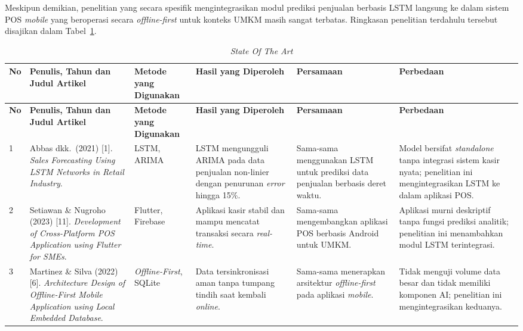 \documentclass[12pt, a4paper, onecolumn, oneside]{report}
\begin{document}
\begin{spacing}{1.5}
Meskipun demikian, penelitian yang secara spesifik mengintegrasikan modul prediksi penjualan berbasis LSTM langsung ke dalam sistem POS \textit{mobile} yang beroperasi secara \textit{offline-first} untuk konteks UMKM masih sangat terbatas. Ringkasan penelitian terdahulu tersebut disajikan dalam Tabel~\ref{tab:sota}.

\setlength{\tabcolsep}{4pt}
{\small{}
\begin{longtable}{|>{\centering\arraybackslash}p{0.6cm}|>{\raggedright\arraybackslash}p{2.2cm}|>{\raggedright\arraybackslash}p{2.2cm}|>{\raggedright\arraybackslash}p{2.2cm}|>{\raggedright\arraybackslash}p{2.2cm}|>{\raggedright\arraybackslash}p{2.8cm}|}

\caption{\textit{State Of The Art}} \label{tab:sota} \\
\hline
\textbf{No} &
\textbf{Penulis, Tahun dan Judul Artikel} &
\textbf{Metode yang Digunakan} &
\textbf{Hasil yang Diperoleh} &
\textbf{Persamaan} &
\textbf{Perbedaan} \\
\hline
\endfirsthead

\hline
\textbf{No} &
\textbf{Penulis, Tahun dan Judul Artikel} &
\textbf{Metode yang Digunakan} &
\textbf{Hasil yang Diperoleh} &
\textbf{Persamaan} &
\textbf{Perbedaan} \\
\hline
\endhead

\hline
\endfoot

\hline
\endlastfoot

1 &
Abbas dkk.~(2021) [1]. \textit{Sales Forecasting Using LSTM Networks in Retail Industry}. &
LSTM, ARIMA &
LSTM mengungguli ARIMA pada data penjualan non-linier dengan penurunan \textit{error} hingga 15\%. &
Sama-sama menggunakan LSTM untuk prediksi data penjualan berbasis deret waktu. &
Model bersifat \textit{standalone} tanpa integrasi sistem kasir nyata; penelitian ini mengintegrasikan LSTM ke dalam aplikasi POS. \\
\hline

2 &
Setiawan \& Nugroho (2023) [11]. \textit{Development of Cross-Platform POS Application using Flutter for SMEs}. &
Flutter, Firebase &
Aplikasi kasir stabil dan mampu mencatat transaksi secara \textit{real-time}. &
Sama-sama mengembangkan aplikasi POS berbasis Android untuk UMKM. &
Aplikasi murni deskriptif tanpa fungsi prediksi analitik; penelitian ini menambahkan modul LSTM terintegrasi. \\
\hline

3 &
Martinez \& Silva (2022) [6]. \textit{Architecture Design of Offline-First Mobile Application using Local Embedded Database}. &
\textit{Offline-First}, SQLite &
Data tersinkronisasi aman tanpa tumpang tindih saat kembali \textit{online}. &
Sama-sama menerapkan arsitektur \textit{offline-first} pada aplikasi \textit{mobile}. &
Tidak menguji volume data besar dan tidak memiliki komponen AI; penelitian ini mengintegrasikan keduanya. \\
\hline


\end{longtable}}
\end{spacing}
\end{document}
